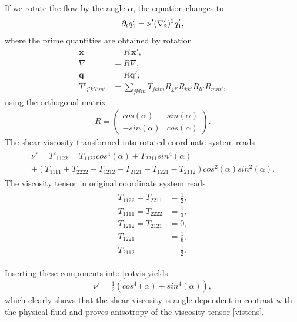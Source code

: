 If we rotate the flow by the angle $\alpha$, the equation changes to
\begin{equation}
\partial_t q'_1 = \nu' (\nabla'_2)^2 q'_1,
\end{equation}
where the prime quantities are obtained by rotation 
\begin{equation}
\begin{split}
\bm{x} &= R \, \bm{ x'}, \\
\nabla &= R \nabla, \\
\bm{q} &= R \bm{q'}, \\
T'_{j'k'l'm'} &= \sum_{jklm} T_{jklm} R_{jj'} R_{kk'} R_{ll'} R_{mm'},
\end{split}
\end{equation}
using the orthogonal matrix
\begin{align}
R = \begin{pmatrix}
cos(\alpha) & sin(\alpha) \\
-sin(\alpha) & cos(\alpha)
\end{pmatrix}.
\end{align}
The shear viscosity transformed into rotated coordinate system reads
\begin{align} \label{rotvis}
\begin{split}
\nu' = T'_{1122} = T_{1122} cos^4(\alpha) + T_{2211} sin^4(\alpha) \\
+ (T_{1111} + T_{2222} - T_{1212} - T_{2121} - T_{1221} - T_{2112})cos^2(\alpha) sin^2(\alpha).
\end{split}
\end{align}
The viscosity tensor in original coordinate system reads
\begin{align}
\begin{split}
T_{1122} = T_{2211} &= \frac{1}{2}, \\
T_{1111} = T_{2222} &= \frac{1}{3}, \\
T_{1212} = T_{2121} &= 0, \\
T_{1221} &= \frac{1}{6}, \\
T_{2112} &= \frac{1}{2}. 
\end{split}
\end{align}

Inserting these components into \ref{rotvis}yields
\begin{align}
\nu' = \frac{1}{2}(cos^4(\alpha) + sin^4(\alpha)),
\end{align}
which clearly shows that the shear viscosity is angle-dependent in contrast with the physical fluid and proves anisotropy of the viscosity tensor \ref{vistens}.


